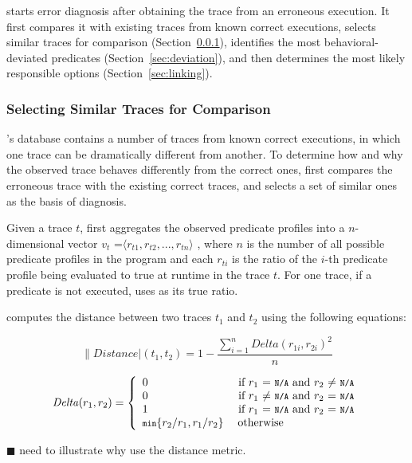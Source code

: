 \ourtool starts error diagnosis after obtaining the trace from
an erroneous execution. It first compares it with
existing traces from known correct executions, selects
similar traces for comparison (Section~\ref{sec:similar}),
identifies the most behavioral-deviated predicates
(Section~\ref{sec:deviation}), and then determines
the most likely responsible options (Section~\ref{sec:linking}).


\subsubsection{Selecting Similar Traces for Comparison}
\label{sec:similar}

\ourtool's database contains a number of
traces from known correct executions, in which one trace
can be dramatically different from another. To
determine how and why the observed trace behaves
differently from the correct ones, \ourtool first
compares the erroneous trace with the existing
correct traces, and selects a set of similar ones
as the basis of diagnosis.

Given a trace $t$, \ourtool first aggregates
the observed predicate profiles into a $n$-dimensional
vector $v_{t}$ =$\langle r_{t1}, r_{t2}, ..., r_{tn}\rangle$ , where $n$
is the number of all possible predicate profiles in the program
and each $r_{ti}$ is the ratio of the $i$-th predicate profile being evaluated
to true at runtime in the trace $t$. For one trace, if a predicate is not executed,
\ourtool uses  as its true ratio.


\ourtool computes the distance between two traces $t_1$ and $t_2$ using
the following equations:

\[
\|Distance|(t_1, t_2) = 1 - \frac{\sum_{i = 1}^{n}Delta(r_{1i}, r_{2i})^2}{n}
\]

\[
\|Delta|(r_1, r_2) = 
\left\{
\begin{array}{l l l l}
  0 & \ \mbox{if $r_1$ = \CodeIn{N/A} and $r_2$ $\neq$ \CodeIn{N/A}}\\
  0 & \ \mbox{if $r_1$ $\neq$ \CodeIn{N/A} and $r_2$ = \CodeIn{N/A}}\\
  1 & \ \mbox{if $r_1$ = \CodeIn{N/A} and $r_2$ = \CodeIn{N/A}}\\
  \CodeIn{min}\{r_2/r_1, r_1/r_2\} & \; \mbox{otherwise}\\ \end{array} \right.
\]


$\blacksquare$ need to illustrate why use the distance metric.

